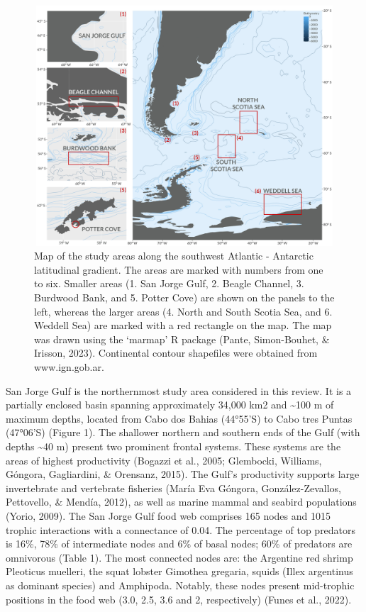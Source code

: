 \documentclass[
]{article}
\begin{document}
\begin{figure}
\centering
\includegraphics[width=6.27in,height=3.528in]{Figures/Map_final.jpg}
\caption{Map of the study areas along the southwest Atlantic - Antarctic
latitudinal gradient. The areas are marked with numbers from one to six.
Smaller areas (1. San Jorge Gulf, 2. Beagle Channel, 3. Burdwood Bank,
and 5. Potter Cove) are shown on the panels to the left, whereas the
larger areas (4. North and South Scotia Sea, and 6. Weddell Sea) are
marked with a red rectangle on the map. The map was drawn using the
`marmap' R package (Pante, Simon-Bouhet, \& Irisson, 2023). Continental
contour shapefiles were obtained from www.ign.gob.ar.}
\end{figure}

San Jorge Gulf is the northernmost study area considered in this review.
It is a partially enclosed basin spanning approximately 34,000 km2 and
\textasciitilde100 m of maximum depths, located from Cabo dos Bahias
(44°55'S) to Cabo tres Puntas (47°06'S) (Figure 1). The shallower
northern and southern ends of the Gulf (with depths \textasciitilde40 m)
present two prominent frontal systems. These systems are the areas of
highest productivity (Bogazzi et al., 2005; Glembocki, Williams,
Góngora, Gagliardini, \& Orensanz, 2015). The Gulf's productivity
supports large invertebrate and vertebrate fisheries (María Eva Góngora,
González-Zevallos, Pettovello, \& Mendía, 2012), as well as marine
mammal and seabird populations (Yorio, 2009). The San Jorge Gulf food
web comprises 165 nodes and 1015 trophic interactions with a connectance
of 0.04. The percentage of top predators is 16\%, 78\% of intermediate
nodes and 6\% of basal nodes; 60\% of predators are omnivorous (Table
1). The most connected nodes are: the Argentine red shrimp Pleoticus
muelleri, the squat lobster Gimothea gregaria, squids (Illex argentinus
as dominant species) and Amphipoda. Notably, these nodes present
mid-trophic positions in the food web (3.0, 2.5, 3.6 and 2,
respectively) (Funes et al., 2022).
\end{document}
